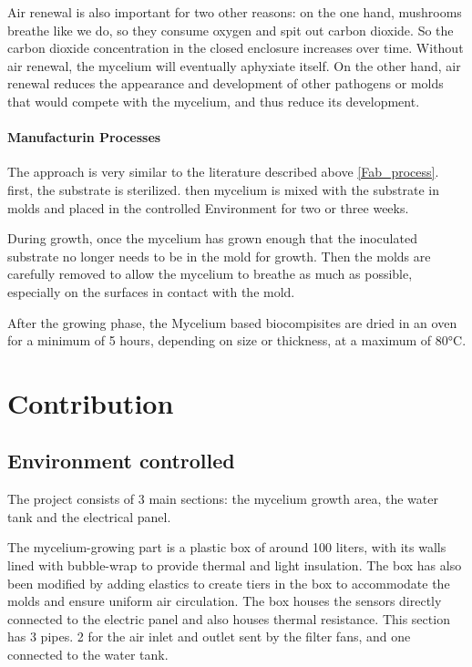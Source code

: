 Air renewal is also important for two other reasons: on the one hand, mushrooms breathe like we do, so they consume oxygen and spit out carbon dioxide. So the carbon dioxide concentration in the closed enclosure increases over time. Without air renewal, the mycelium will eventually aphyxiate itself. 
On the other hand, air renewal reduces the appearance and development of other pathogens or molds that would compete with the mycelium, and thus reduce its development. 


\paragraph[short]{Manufacturin Processes}

The approach is very similar to the literature described above \ref{Fab_process}.
first, the substrate is sterilized. then mycelium is mixed with the substrate in molds and placed in the controlled Environment for two or three weeks. 

During growth, once the mycelium has grown enough that the inoculated substrate no longer needs to be in the mold for growth. 
Then the molds are carefully removed to allow the mycelium to breathe as much as possible, especially on the surfaces in contact with the mold. 

After the growing phase, the Mycelium based biocompisites are dried in an oven for a minimum of 5 hours, depending on size or thickness, at a maximum of 80°C. 

\section{Contribution}

\subsection{Environment controlled}

The project consists of 3 main sections: the mycelium growth area, the water tank and the electrical panel.

The mycelium-growing part is a plastic box of around 100 liters, with its walls lined with bubble-wrap to provide thermal and light insulation. The box has also been modified by adding elastics to create tiers in the box to accommodate the molds and ensure uniform air circulation. The box houses the sensors directly connected to the electric panel and also houses thermal resistance. This section has 3 pipes. 2 for the air inlet and outlet sent by the filter fans, and one connected to the water tank.

